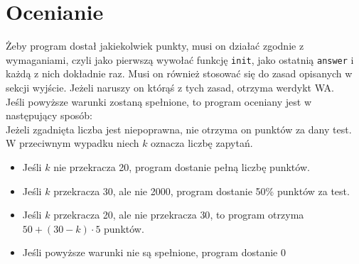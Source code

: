 \documentclass{spiral}
\begin{document}
\section{Ocenianie}
    Żeby program dostał jakiekolwiek punkty, musi on działać zgodnie z wymaganiami, czyli jako pierwszą wywołać funkcję \texttt{init}, jako ostatnią \texttt{answer} i każdą z nich dokładnie raz.
    Musi on również stosować się do zasad opisanych w sekcji wyjście.
    Jeżeli naruszy on którąś z tych zasad, otrzyma werdykt WA.\\
    Jeśli powyższe warunki zostaną spełnione,
    to program oceniany jest w następujący sposób:\\
    Jeżeli zgadnięta liczba jest niepoprawna, nie otrzyma on punktów za dany test.\\
    W przeciwnym wypadku niech $k$ oznacza liczbę zapytań.
    \begin{itemize}
    \item Jeśli $k$ nie przekracza 20, program dostanie pełną liczbę punktów.
    \item Jeśli $k$ przekracza 30, ale nie 2000,
    program dostanie 50\% punktów za test.
    \item Jeśli $k$ przekracza 20, ale nie przekracza $30$, to program otrzyma
    $50 + (30 - k) \cdot 5$ punktów.
    \item Jeśli powyższe warunki nie są spełnione, program dostanie 0
    \end{itemize}
\end{document}
